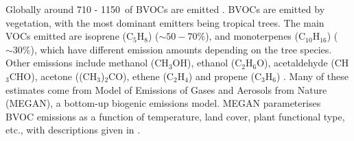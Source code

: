     Globally around 710 - 1150\tgcpyr ~of BVOCs are emitted \parencite{Guenther1995,Lathiere2006,Guenther2012, Messina2016}.
    BVOCs are emitted by vegetation, with the most dominant emitters being 
    tropical trees. 
    The main VOCs emitted are isoprene (C$_5$H$_8$) ($\sim50-70\%$), and 
    monoterpenes (C$_10$H$_16$) ($\sim30\%$), which have different emission 
    amounts depending on the tree 
    species\parencite{Guenther2012,Sindelarova2014}. 
    Other emissions include methanol (CH$_3$OH), ethanol (C$_2$H$_6$O), 
    acetaldehyde (CH$_3$CHO), acetone ((CH$_3$)$_2$CO), ethene (C$_2$H$_4$) and 
    propene (C$_3$H$_6$) \parencite{Guenther2012}.
    Many of these estimates come from Model of Emissions of Gases and Aerosols 
    from Nature (MEGAN), a bottom-up biogenic emissions model.
    MEGAN parameterises BVOC emissions as a function of temperature, land 
    cover, plant functional type, etc., with descriptions given in 
    \textcite{Guenther2012}.

    
    
    
    
